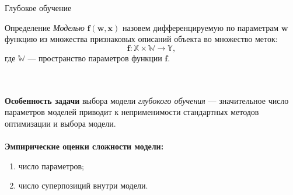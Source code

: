 \documentclass[usenames,dvipsnames,11pt,pdf,utf8,russian,aspectratio=43]{beamer}
\begin{document}
\begin{frame}{Глубокое обучение}
\begin{block}{Определение}
\textit{Моделью} $\mathbf{f}(\mathbf{w}, \mathbf{x})$ назовем дифференцируемую по параметрам $\mathbf{w}$ функцию из множества признаковых описаний объекта во множество меток:
\[
    \mathbf{f}: \mathbb{X} \times \mathbb{W} \to \mathbb{Y},
\] 
где $\mathbb{W}$ --- пространство параметров функции $\mathbf{f}$.
\end{block}
~\\~\\
\textbf{Особенность задачи}  выбора модели \textit{глубокого обучения} --- значительное число параметров моделей приводит к неприменимости стандартных методов оптимизации и выбора модели. \\~\\

\textbf{Эмпирические оценки сложности модели:}
\begin{enumerate}
\item число параметров;
\item число суперпозиций внутри модели.
\end{enumerate}
\end{frame}
\end{document}
